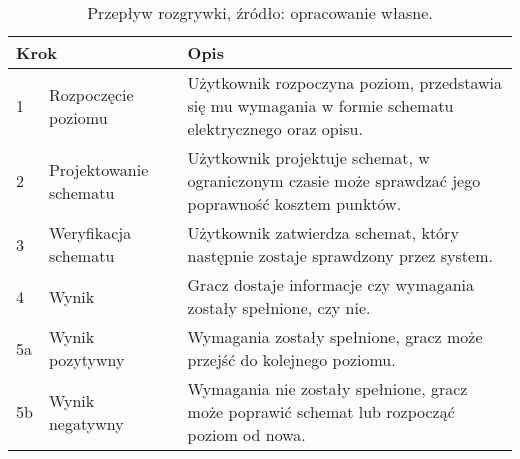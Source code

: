 \begin{table}[h]
    \centering
    \caption[Przepływ rozgrywki.]
    {Przepływ rozgrywki, źródło: opracowanie własne.}
    \label{tab:game_flow}
    \begin{tabular}{|l p{}|p{}|}
        \hline
        \multicolumn{2}{|l|}{Krok} & Opis \\
        \hline
        \hline
        1 & Rozpoczęcie poziomu &
        Użytkownik rozpoczyna poziom, przedstawia się mu wymagania w formie schematu elektrycznego oraz opisu. \\
        \hline
        2 & Projektowanie schematu &
        Użytkownik projektuje schemat, w ograniczonym czasie może sprawdzać jego poprawność kosztem punktów. \\
        \hline
        3 & Weryfikacja schematu &
        Użytkownik zatwierdza schemat, który następnie zostaje sprawdzony przez system. \\
        \hline
        4 & Wynik &
        Gracz dostaje informacje czy wymagania zostały spełnione, czy nie. \\
        \hline
        5a & Wynik pozytywny &
        Wymagania zostały spełnione, gracz może przejść do kolejnego poziomu. \\
        \hline
        5b & Wynik negatywny &
        Wymagania nie zostały spełnione, gracz może poprawić schemat lub rozpocząć poziom od nowa. \\
        \hline
    \end{tabular}
\end{table}


%

